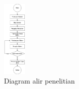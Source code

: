 \begin{figure} [ht]
  \centering
  \includegraphics[width=0.1\textwidth]{gambar/flow_fix5.png}

  \caption{Diagram alir penelitian}
  \label{fig:flow}
\end{figure}










